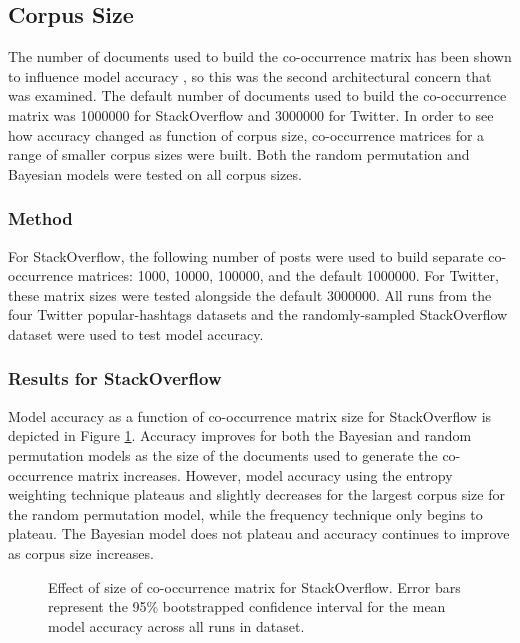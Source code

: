 \documentclass[man,floatsintext,donotrepeattitle]{apa6}
\begin{document}
\subsection{Corpus Size}

The number of documents used to build the co-occurrence matrix has been shown to influence model accuracy \parencite{Sahlgren2008}, so this was the second architectural concern that was examined.
The default number of documents used to build the co-occurrence matrix was \num{1000000} for StackOverflow and \num{3000000} for Twitter.
In order to see how accuracy changed as function of corpus size, 
co-occurrence matrices for a range of smaller corpus sizes were built.
Both the random permutation and Bayesian models were tested on all corpus sizes.

\subsubsection{Method}

For StackOverflow, the following number of posts were used to build separate co-occurrence matrices: \num{1000}, \num{10000}, \num{100000}, and the default \num{1000000}.
For Twitter, these matrix sizes were tested alongside the default \num{3000000}.
All runs from the four Twitter popular-hashtags datasets and the randomly-sampled StackOverflow dataset were used to test model accuracy.

\subsubsection{Results for StackOverflow}

Model accuracy as a function of co-occurrence matrix size for StackOverflow is depicted in Figure \ref{figContextDocumentSizeSO}.
Accuracy improves for both the Bayesian and random permutation models as the size of the documents used to generate the co-occurrence matrix increases.
However, model accuracy using the entropy weighting technique plateaus and slightly decreases for the largest corpus size for the random permutation model, while the frequency technique only begins to plateau. 
The Bayesian model does not plateau and accuracy continues to improve as corpus size increases.

\begin{figure}[!htbp]
  \caption{
    Effect of size of co-occurrence matrix for StackOverflow.
    Error bars represent the 95\% bootstrapped confidence interval for the mean model accuracy across all runs in dataset.
  }
  \label{figContextDocumentSizeSO}
\end{figure}
\end{document}
